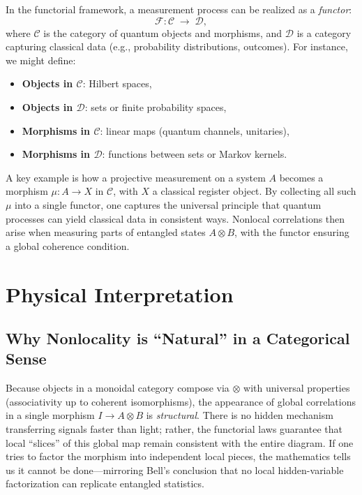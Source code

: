 \documentclass[12pt]{article}
\begin{document}
In the functorial framework, a measurement process can be realized as a \emph{functor}:
\begin{equation}
\mathcal{F} : \mathcal{C} \;\longrightarrow\; \mathcal{D},
\end{equation}
where $\mathcal{C}$ is the category of quantum objects and morphisms, and $\mathcal{D}$ is a category capturing classical data (e.g., probability distributions, outcomes). For instance, we might define:
\begin{itemize}
    \item \textbf{Objects in $\mathcal{C}$}: Hilbert spaces,
    \item \textbf{Objects in $\mathcal{D}$}: sets or finite probability spaces,
    \item \textbf{Morphisms in $\mathcal{C}$}: linear maps (quantum channels, unitaries),
    \item \textbf{Morphisms in $\mathcal{D}$}: functions between sets or Markov kernels.
\end{itemize}

A key example is how a projective measurement on a system $A$ becomes a morphism $\mu: A \to X$ in $\mathcal{C}$, with $X$ a classical register object. By collecting all such $\mu$ into a single functor, one captures the universal principle that quantum processes can yield classical data in consistent ways. Nonlocal correlations then arise when measuring parts of entangled states $A \otimes B$, with the functor ensuring a global coherence condition.

\vspace{1em}

\section{Physical Interpretation}

\subsection{Why Nonlocality is ``Natural'' in a Categorical Sense}

Because objects in a monoidal category compose via $\otimes$ with universal properties (associativity up to coherent isomorphisms), the appearance of global correlations in a single morphism $I \to A \otimes B$ is \emph{structural}. There is no hidden mechanism transferring signals faster than light; rather, the functorial laws guarantee that local ``slices'' of this global map remain consistent with the entire diagram. If one tries to factor the morphism into independent local pieces, the mathematics tells us it cannot be done---mirroring Bell’s conclusion that no local hidden-variable factorization can replicate entangled statistics.
\end{document}

